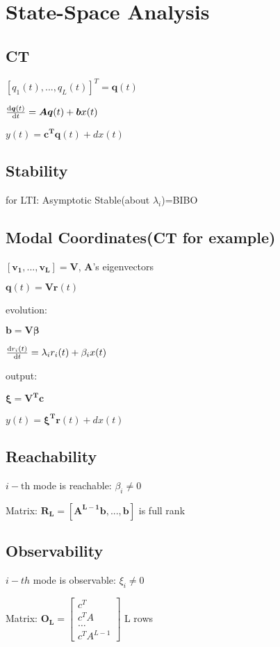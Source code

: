 \section{State-Space Analysis}
\subsection*{CT}
$[q_1(t),...,q_L(t)]^T=\boldsymbol{q}(t)$

$\frac{\mathrm{d} \boldsymbol{q}(t)}{\mathrm{d} t}=\boldsymbol{Aq}(t)+\boldsymbol{b}x(t)$

$y(t)=\boldsymbol{c^Tq}(t)+dx(t)$

\subsection*{Stability}

for LTI: Asymptotic Stable(about $\lambda_i$)=BIBO

\subsection*{Modal Coordinates(CT for example)}

$[\boldsymbol{v_1},...,\boldsymbol{v_L}]=\boldsymbol{V}$,   $\boldsymbol{A}$'s eigenvectors

$\boldsymbol{q}(t)=\boldsymbol{Vr}(t)$

evolution:  

$\boldsymbol{b}=\boldsymbol{V\beta}$

$\frac{\mathrm{d} r_i(t)}{\mathrm{d} t}=\lambda_i r_i(t) + \beta_i x(t)$

output:   

$\boldsymbol{\xi}=\boldsymbol{V^T c}$

$y(t)=\boldsymbol{\xi^Tr}(t)+dx(t)$

\subsection*{Reachability}

$i-\text{th}$ mode is reachable: $\beta_i \neq 0$

Matrix: $\boldsymbol{R_L}=[\boldsymbol{A^{L-1}b}, ..., \boldsymbol{b}]$ is full rank

\subsection*{Observability}

$i-{th}$ mode is observable: $\xi_i \neq 0$

Matrix: $\boldsymbol{O_L}=\begin{bmatrix}c^T\\c^TA\\\ldots\\ c^TA^{L-1}\end{bmatrix}$   L rows